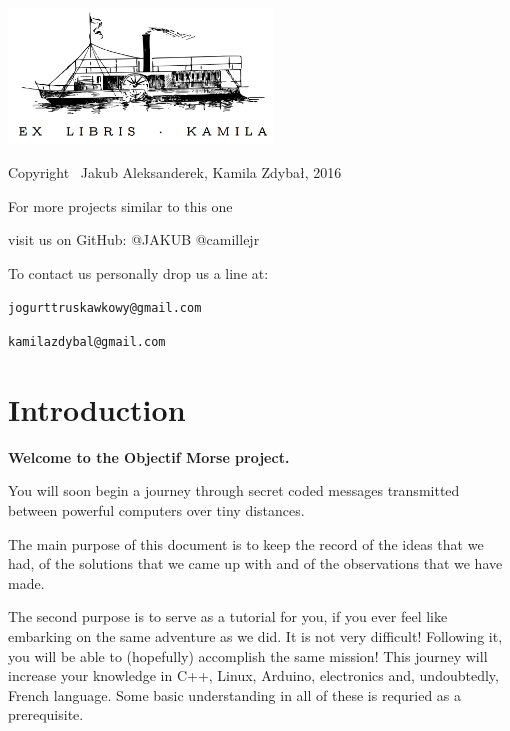 \documentclass[12pt]{report}
\begin{document}
\thispagestyle{empty}
\begin{center}
    
\vspace*{4cm}

\includegraphics[width = 70mm]{ex_libris.png}

\vspace*{2cm}

Copyright \textcopyright \, Jakub Aleksanderek, Kamila Zdybał, 2016

For more projects similar to this one

visit us on GitHub: @JAKUB @camillejr

To contact us personally drop us a line at:

\verb|jogurttruskawkowy@gmail.com|

\verb|kamilazdybal@gmail.com|

\end{center}
\newpage




\setlength{\parindent}{0cm}
\clearpage

\tableofcontents

\setlength{\parskip}{1em}
\renewcommand{\baselinestretch}{1.0}

\chapter{Introduction}\label{chap:intro}

\textbf{Welcome to the Objectif Morse project.} 

You will soon begin a journey through secret coded messages transmitted between powerful computers over tiny distances. 

The main purpose of this document is to keep the record of the ideas that we had, of the solutions that we came up with and of the observations that we have made. 

The second purpose is to serve as a tutorial for you, if you ever feel like embarking on the same adventure as we did. It is not very difficult! Following it, you will be able to (hopefully) accomplish the same mission! This journey will increase your knowledge in C++, Linux, Arduino, electronics and, undoubtedly, French language. Some basic understanding in all of these is requried as a prerequisite.
\end{document}
